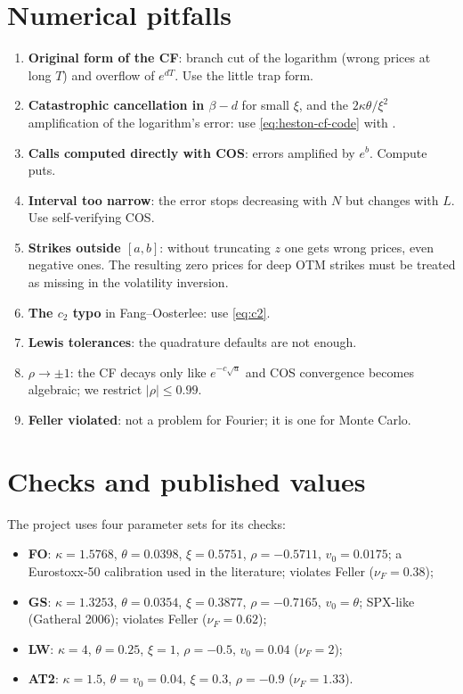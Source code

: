 \section{Numerical pitfalls}
\begin{enumerate}
\item \textbf{Original form of the CF}: branch cut of the logarithm (wrong prices at long $T$) and overflow of
$e^{dT}$. Use the little trap form.
\item \textbf{Catastrophic cancellation in $\beta-d$} for small $\xi$, and the $2\kappa\theta/\xi^2$ amplification of the
logarithm's error: use \eqref{eq:heston-cf-code} with .
\item \textbf{Calls computed directly with COS}: errors amplified by $e^b$. Compute puts.
\item \textbf{Interval too narrow}: the error stops decreasing with $N$ but changes with $L$. Use self-verifying COS.
\item \textbf{Strikes outside $[a,b]$}: without truncating $z$ one gets wrong prices, even negative ones. The resulting
zero prices for deep OTM strikes must be treated as missing in the volatility inversion.
\item \textbf{The $c_2$ typo} in Fang--Oosterlee: use \eqref{eq:c2}.
\item \textbf{Lewis tolerances}: the quadrature defaults are not enough.
\item \textbf{$\rho\to\pm1$}: the CF decays only like $e^{-c\sqrt u}$ and COS convergence becomes algebraic; we
restrict $|\rho|\le0.99$.
\item \textbf{Feller violated}: not a problem for Fourier; it is one for Monte Carlo.
\end{enumerate}

\section{Checks and published values}
The project uses four parameter sets for its checks:
\begin{itemize}
\item \textbf{FO}: $\kappa=1.5768$, $\theta=0.0398$, $\xi=0.5751$, $\rho=-0.5711$, $v_0=0.0175$; a Eurostoxx-50
calibration used in the literature; violates Feller ($\nu_F=0.38$);
\item \textbf{GS}: $\kappa=1.3253$, $\theta=0.0354$, $\xi=0.3877$, $\rho=-0.7165$, $v_0=\theta$; SPX-like
(Gatheral 2006); violates Feller ($\nu_F=0.62$);
\item \textbf{LW}: $\kappa=4$, $\theta=0.25$, $\xi=1$, $\rho=-0.5$, $v_0=0.04$ ($\nu_F=2$);
\item \textbf{AT2}: $\kappa=1.5$, $\theta=v_0=0.04$, $\xi=0.3$, $\rho=-0.9$ ($\nu_F=1.33$).
\end{itemize}

